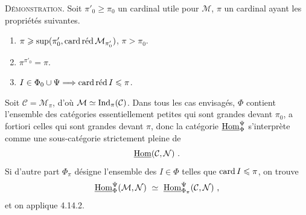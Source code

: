 \noindent\textsc{Démonstration}. Soit $\pi'_0\geqslant\pi_0$ un cardinal utile pour $\mathcal{M}$, $\pi$ un cardinal ayant les propriétés suivantes.
\begin{enumerate}[leftmargin=2.5em]
\item[a)] $\pi\geqslant\sup(\pi'_0,\cardred\mathcal{M}_{\pi'_0})$, $\pi>\pi_0$.
\item[b)] $\pi^{\pi'_0}=\pi$.
\item[c)] $I\in\Phi_0\cup\Psi\Longrightarrow\cardred I\leqslant\pi$.
\end{enumerate}
\noindent Soit $\mathcal{C}=\mathcal{M}_\pi$, d'où $\mathcal{M}\simeq\Ind_\pi(\mathcal{C})$. Dans tous les cas envisagés, $\Phi$ contient l'ensemble des catégories essentiellement petites qui sont grandes devant $\pi_0$, a fortiori celles qui sont grandes devant $\pi$, donc la catégorie $\uHom^{\Psi}_{\Phi}$ s'interprète comme une sous-catégorie strictement pleine de
\[
\uHom(\mathcal{C},\mathcal{N})\ .
\]
Si d'autre part $\Phi_\pi$ désigne l'ensemble des $I\in\Phi$ telles que $\card I\leqslant\pi$, on trouve
\[
\uHom^{\Psi}_{\Phi}(\mathcal{M},\mathcal{N})\ \simeq\ \uHom^{\Psi}_{\Phi_\pi}(\mathcal{C},\mathcal{N})\ ,
\]
et on applique 4.14.2.



